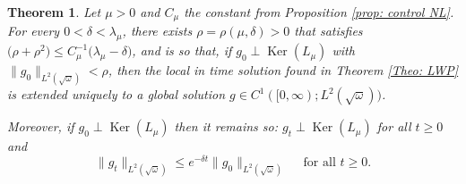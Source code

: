 \documentclass[reqno,11pt,letterpaper]{amsart}
\numberwithin{equation}{section}
\newtheorem{theorem}{Theorem}
\begin{document}
\begin{theorem}
Let $\mu>0$ and $C_\mu$ the constant from Proposition \ref{prop: control NL}. For every $0<\delta<\lambda_\mu$, there exists $\rho = \rho(\mu,\delta)>0$ that satisfies 
$  \big( \rho+ \rho^2
    \big)
    \leq C_\mu^{-1} \big(\lambda_\mu-\delta\big)$, and is so that, if $g_0 \perp \operatorname{Ker}(L_\mu)$ with  $\|g_0\|_{L^2(\sqrt{\omega})} < \rho$, then the local in time solution found in Theorem \ref{Theo: LWP} is extended uniquely to a global solution $g \in C^1( [0,\infty);L^2(\sqrt{\omega}))$. 
    
    Moreover, if $g_0 \perp \operatorname{Ker}(L_\mu)$ then it remains so: $g_t \perp \operatorname{Ker}(L_\mu)$ for all $t\geq 0$ and
    \begin{equation}
        \|g_t\|_{L^2(\sqrt{\omega})} \leq e^{- \delta t} \|g_0\|_{L^2(\sqrt{\omega})} \quad \text{ for all } t\geq 0.
    \end{equation}
\end{theorem}
\end{document}
